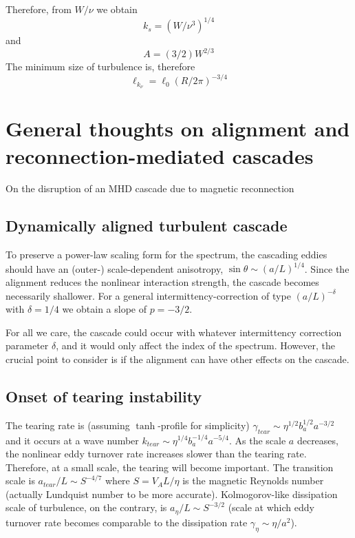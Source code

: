 \documentclass[usenatbib,twocolumn, twocolappendix]{aastex63}
\begin{document}
\begin{appendix}
Therefore, from $W/\nu$ we obtain
\begin{equation}
k_s = (W/\nu^3)^{1/4}
\end{equation}
and
\begin{equation}
    A = (3/2) W^{2/3}
\end{equation}
The minimum size of turbulence is, therefore
\begin{equation}
    \ell_{k_\nu} = \ell_0 (R/2\pi)^{-3/4}
\end{equation}



\section{General thoughts on alignment and reconnection-mediated cascades}
On the disruption of an MHD cascade due to magnetic reconnection


\subsection{Dynamically aligned turbulent cascade}

To preserve a power-law scaling form for the spectrum, the cascading eddies should have an (outer-) scale-dependent anisotropy, $\sin\theta \sim (a/L)^{1/4}$.
Since the alignment reduces the nonlinear interaction strength, the cascade becomes necessarily shallower.
For a general intermittency-correction of type $(a/L)^{-\delta}$ with $\delta = 1/4$ we obtain a slope of $p = -3/2$.

For all we care, the cascade could occur with whatever intermittency correction parameter $\delta$, and it would only affect the index of the spectrum.
However, the crucial point to consider is if the alignment can have other effects on the cascade.


\subsection{Onset of tearing instability}


The tearing rate is (assuming $\tanh$-profile for simplicity) $\gamma_{tear} \sim \eta^{1/2} b_a^{1/2} a^{-3/2}$ and it occurs at a wave number $k_{tear} \sim \eta^{1/4} b_a^{-1/4} a^{-5/4}$.
As the scale $a$ decreases, the nonlinear eddy turnover rate increases slower than the tearing rate.
Therefore, at a small scale, the tearing will become important.
The transition scale is $a_{tear}/L \sim S^{-4/7}$ where $S = V_A L/\eta$ is the magnetic Reynolds number (actually Lundquist number to be more accurate).
Kolmogorov-like dissipation scale of turbulence, on the contrary, is $a_\eta/L \sim S^{-3/2}$ (scale at which eddy turnover rate becomes comparable to the dissipation rate $\gamma_\eta \sim \eta/a^2$).


\end{appendix}
\end{document}

